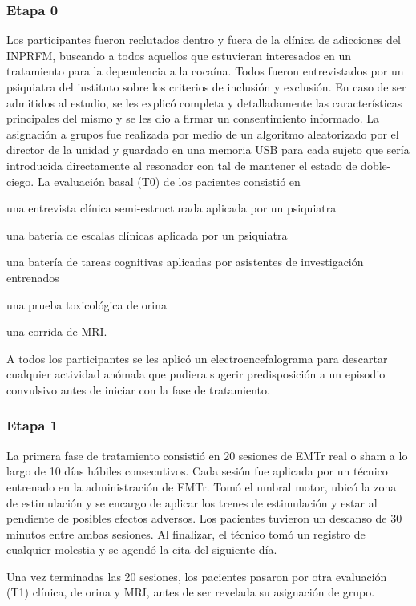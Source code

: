 \subsubsection{Etapa 0}
Los participantes fueron reclutados dentro y fuera de la clínica de adicciones del INPRFM, buscando a todos aquellos que estuvieran interesados en un tratamiento para la dependencia a la cocaína.
Todos fueron entrevistados por un psiquiatra del instituto sobre los criterios de inclusión y exclusión.
En caso de ser admitidos al estudio, se les explicó completa y detalladamente las características principales del mismo y se les dio a firmar un consentimiento informado.
La asignación a grupos fue realizada por medio de un algoritmo aleatorizado por el director de la unidad y guardado en una memoria USB para cada sujeto que sería introducida directamente al resonador con tal de mantener el estado de doble-ciego.
La evaluación basal (T0) de los pacientes consistió en
\begin{enumerate*}[label=\emph{\alph*}), before=\unskip{: }, itemjoin={{; }}, itemjoin*={{, y }}]
    \item una entrevista clínica semi-estructurada aplicada por un psiquiatra
    \item una batería de escalas clínicas aplicada por un psiquiatra
    \item una batería de tareas cognitivas aplicadas por asistentes de investigación entrenados
    \item una prueba toxicológica de orina
    \item una corrida de MRI.
\end{enumerate*}
A todos los participantes se les aplicó un electroencefalograma para descartar cualquier actividad anómala que pudiera sugerir predisposición a un episodio convulsivo antes de iniciar con la fase de tratamiento.

\subsubsection{Etapa 1}
La primera fase de tratamiento consistió en 20 sesiones de EMTr real o sham a lo largo de 10 días hábiles consecutivos. Cada sesión fue aplicada por un técnico entrenado en la administración de EMTr. Tomó el umbral motor, ubicó la zona de estimulación y se encargo de aplicar los trenes de estimulación y estar al pendiente de posibles efectos adversos.
Los pacientes tuvieron un descanso de 30 minutos entre ambas sesiones.
Al finalizar, el técnico tomó un registro de cualquier molestia y se agendó la cita del siguiente día.\par
Una vez terminadas las 20 sesiones, los pacientes pasaron por otra evaluación (T1) clínica, de orina y MRI, antes de ser revelada su asignación de grupo.

